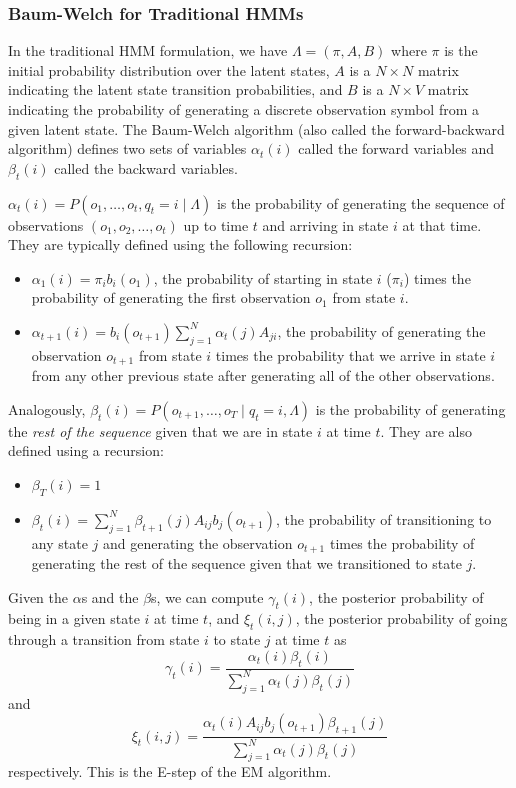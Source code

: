 \subsubsection{Baum-Welch for Traditional HMMs}
In the traditional HMM formulation, we have $\Lambda = (\pi, A, B)$ where
$\pi$ is the initial probability distribution over the latent states,
$A$ is a $N\times N$ matrix indicating the latent state transition
probabilities, and $B$ is a $N \times V$ matrix indicating the probability
of generating a discrete observation symbol from a given latent state. The
Baum-Welch algorithm (also called the forward-backward algorithm) defines
two sets of variables $\alpha_t(i)$ called the forward variables and
$\beta_t(i)$ called the backward variables.

$\alpha_t(i) = P(o_1, \ldots, o_t, q_t = i \mid \Lambda)$ is the probability of
generating the sequence of observations $(o_1, o_2, \ldots, o_t)$ up to time
$t$ and arriving in state $i$ at that time. They are typically defined
using the following recursion:
\begin{itemize}
  \item $\alpha_1(i) = \pi_i b_i(o_1)$, the probability of starting in
    state $i$ ($\pi_i$) times the probability of generating the first
    observation $o_1$ from state $i$.
  \item $\alpha_{t+1}(i) = b_i(o_{t+1})\sum_{j=1}^N \alpha_t(j) A_{ji}$,
    the probability of generating the observation $o_{t+1}$ from state $i$
    times the probability that we arrive in state $i$ from any other
    previous state after generating all of the other observations.
\end{itemize}

Analogously, $\beta_t(i) = P(o_{t+1}, \ldots, o_{T} \mid q_t = i, \Lambda)$
is the probability of generating the \emph{rest of the sequence} given that
we are in state $i$ at time $t$. They are also defined using a recursion:
\begin{itemize}
  \item $\beta_T(i) = 1$
  \item $\beta_t(i) = \sum_{j=1}^N \beta_{t+1}(j) A_{ij} b_j(o_{t+1})$, the
    probability of transitioning to any state $j$ and generating the
    observation $o_{t+1}$ times the probability of generating the rest of
    the sequence given that we transitioned to state $j$.
\end{itemize}

Given the $\alpha$s and the $\beta$s, we can compute $\gamma_t(i)$, the posterior
probability of being in a given state $i$ at time $t$, and $\xi_t(i,j)$,
the posterior probability of going through a transition from state $i$ to
state $j$ at time $t$ as
\begin{equation}
  \gamma_t(i) = \frac{\alpha_t(i)\beta_t(i)}{\sum_{j=1}^N
  \alpha_t(j)\beta_t(j)}
\end{equation}
and
\begin{equation}
  \xi_t(i,j) = \frac{\alpha_t(i) A_{ij} b_j(o_{t+1}) \beta_{t+1}(j)}
  {\sum_{j=1}^N \alpha_t(j)\beta_t(j)}
\end{equation}
respectively. This is the E-step of the EM algorithm.

